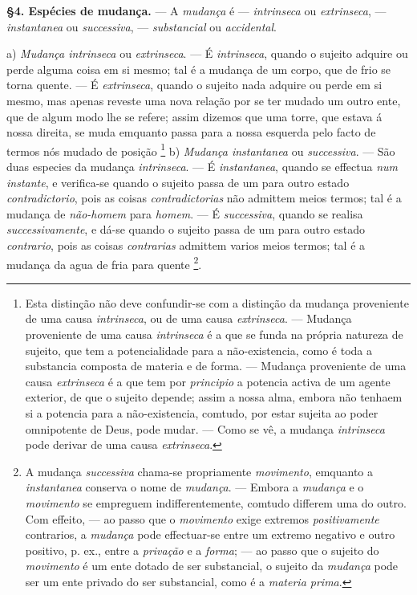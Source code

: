 \textbf{§4. Espécies de mudança.} --- A \emph{mudança} é --- \emph{intrinseca} ou \emph{extrinseca}, --- \emph{instantanea} ou \emph{successiva}, --- \emph{substancial} ou \emph{accidental}.

a) \emph{Mudança intrinseca} ou \emph{extrinseca}. --- É \emph{intrinseca}, quando o sujeito adquire ou perde alguma coisa em si mesmo; tal é a mudança de um corpo, que de frio se torna quente. --- É \emph{extrinseca}, quando o sujeito nada adquire ou perde em si mesmo, mas apenas reveste uma nova relação por se ter mudado um outro ente, que de algum modo lhe se refere; assim dizemos que uma torre, que estava á nossa direita, se muda emquanto passa para a nossa esquerda pelo facto de termos nós mudado de posição \footnote{Esta distinção não deve confundir-se com a distinção da mudança proveniente de uma causa \emph{intrinseca}, ou de uma causa \emph{extrinseca}. --- Mudança proveniente de uma causa \emph{intrinseca} é a que se funda na própria natureza de sujeito, que tem a potencialidade para a não-existencia, como é toda a substancia composta de materia e de forma. --- Mudança proveniente de uma causa \emph{extrinseca} é a que tem por \emph{principio} a potencia activa de um agente exterior, de que o sujeito depende; assim a nossa alma, embora não tenhaem si a potencia para a não-existencia, comtudo, por estar sujeita ao poder omnipotente de Deus, pode mudar. --- Como se vê, a mudança \emph{intrinseca} pode derivar de uma causa \emph{extrinseca}.}
 b) \emph{Mudança instantanea} ou \emph{successiva}. --- São duas especies da mudança \emph{intrinseca}. --- É \emph{instantanea}, quando se effectua \emph{num instante}, e verifica-se quando o sujeito passa de um para outro estado \emph{contradictorio}, pois as coisas \emph{contradictorias} não admittem meios termos; tal é a mudança de \emph{não-homem} para \emph{homem}. --- É \emph{successiva}, quando se realisa \emph{successivamente}, e dá-se quando o sujeito passa de um para outro estado \emph{contrario}, pois as coisas \emph{contrarias} admittem varios meios termos; tal é a mudança da agua de fria para quente \footnote{A mudança \emph{successiva} chama-se propriamente \emph{movimento}, emquanto a \emph{instantanea} conserva o nome de \emph{mudança}. --- Embora a \emph{mudança} e o \emph{movimento} se empreguem indifferentemente, comtudo differem uma do outro. Com effeito, --- ao passo que o \emph{movimento} exige extremos \emph{positivamente} contrarios, a \emph{mudança} pode effectuar-se entre um extremo negativo e outro positivo, p. ex., entre a \emph{privação} e a \emph{forma}; --- ao passo que o sujeito do \emph{movimento} é um ente dotado de ser substancial, o sujeito da \emph{mudança} pode ser um ente privado do ser substancial, como é a \emph{materia prima}.}.

